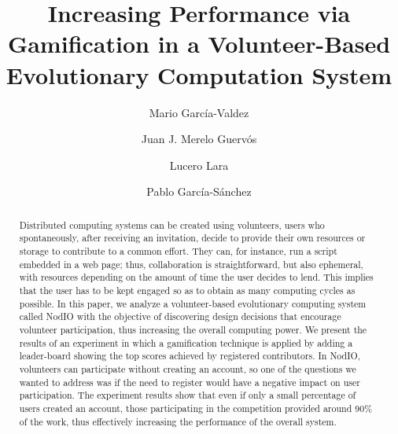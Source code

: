 \documentclass{llncs}
\begin{document}
\sloppy

\title{Increasing Performance via Gamification in a Volunteer-Based Evolutionary Computation System}

\author{Mario Garc\'ia-Valdez \and Juan J. Merelo Guerv\'os \and  Lucero Lara  \and Pablo Garc\'ia-S\'anchez }



\maketitle


\begin{abstract}

Distributed computing systems can be created using volunteers, users who spontaneously, after receiving an invitation, decide to
provide their own resources or storage to contribute to a common
effort. They can, for instance, run a script embedded in a web page;
thus, collaboration is straightforward, but also ephemeral, with
resources depending on the amount of time the user decides to
lend. This implies that the user has to be kept engaged so as to
obtain as many computing cycles as possible. In this paper, we analyze
a volunteer-based evolutionary computing system called  NodIO
with the objective of discovering design decisions that
encourage volunteer participation, thus increasing the overall
computing power. We present the results of an experiment in which a
gamification technique is applied by adding a leader-board showing the
top scores achieved by registered contributors. In NodIO,
volunteers can participate without creating an account, so one of the questions we wanted to address was if the
need to register would have a negative impact on user participation.
The experiment results show that even if only a small percentage of
users created an account, those participating in the competition
provided around 90\% of the work, thus effectively increasing the
performance of the overall system. %


\end{abstract}
\end{document}
